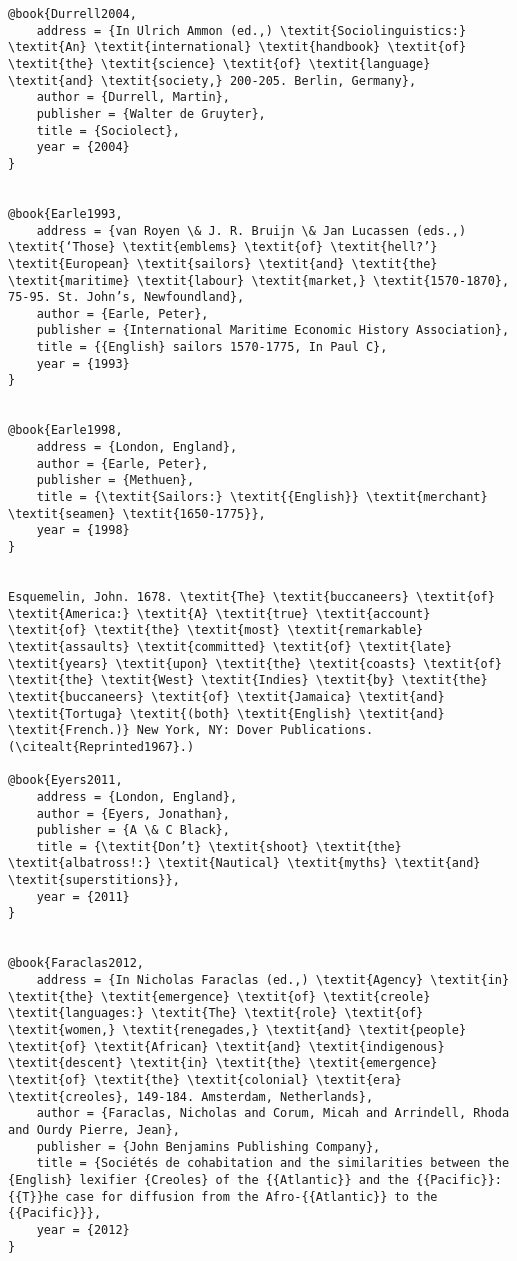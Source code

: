 \begin{verbatim}
@book{Durrell2004,
	address = {In Ulrich Ammon (ed.,) \textit{Sociolinguistics:} \textit{An} \textit{international} \textit{handbook} \textit{of} \textit{the} \textit{science} \textit{of} \textit{language} \textit{and} \textit{society,} 200-205. Berlin, Germany},
	author = {Durrell, Martin},
	publisher = {Walter de Gruyter},
	title = {Sociolect},
	year = {2004}
}


@book{Earle1993,
	address = {van Royen \& J. R. Bruijn \& Jan Lucassen (eds.,) \textit{‘Those} \textit{emblems} \textit{of} \textit{hell?’} \textit{European} \textit{sailors} \textit{and} \textit{the} \textit{maritime} \textit{labour} \textit{market,} \textit{1570-1870}, 75-95. St. John’s, Newfoundland},
	author = {Earle, Peter},
	publisher = {International Maritime Economic History Association},
	title = {{English} sailors 1570-1775, In Paul C},
	year = {1993}
}


@book{Earle1998,
	address = {London, England},
	author = {Earle, Peter},
	publisher = {Methuen},
	title = {\textit{Sailors:} \textit{{English}} \textit{merchant} \textit{seamen} \textit{1650-1775}},
	year = {1998}
}


Esquemelin, John. 1678. \textit{The} \textit{buccaneers} \textit{of} \textit{America:} \textit{A} \textit{true} \textit{account} \textit{of} \textit{the} \textit{most} \textit{remarkable} \textit{assaults} \textit{committed} \textit{of} \textit{late} \textit{years} \textit{upon} \textit{the} \textit{coasts} \textit{of} \textit{the} \textit{West} \textit{Indies} \textit{by} \textit{the} \textit{buccaneers} \textit{of} \textit{Jamaica} \textit{and} \textit{Tortuga} \textit{(both} \textit{English} \textit{and} \textit{French.)} New York, NY: Dover Publications. (\citealt{Reprinted1967}.)

@book{Eyers2011,
	address = {London, England},
	author = {Eyers, Jonathan},
	publisher = {A \& C Black},
	title = {\textit{Don’t} \textit{shoot} \textit{the} \textit{albatross!:} \textit{Nautical} \textit{myths} \textit{and} \textit{superstitions}},
	year = {2011}
}


@book{Faraclas2012,
	address = {In Nicholas Faraclas (ed.,) \textit{Agency} \textit{in} \textit{the} \textit{emergence} \textit{of} \textit{creole} \textit{languages:} \textit{The} \textit{role} \textit{of} \textit{women,} \textit{renegades,} \textit{and} \textit{people} \textit{of} \textit{African} \textit{and} \textit{indigenous} \textit{descent} \textit{in} \textit{the} \textit{emergence} \textit{of} \textit{the} \textit{colonial} \textit{era} \textit{creoles}, 149-184. Amsterdam, Netherlands},
	author = {Faraclas, Nicholas and Corum, Micah and Arrindell, Rhoda and Ourdy Pierre, Jean},
	publisher = {John Benjamins Publishing Company},
	title = {Sociétés de cohabitation and the similarities between the {English} lexifier {Creoles} of the {{Atlantic}} and the {{Pacific}}: {{T}}he case for diffusion from the Afro-{{Atlantic}} to the {{Pacific}}},
	year = {2012}
}



\end{verbatim}
